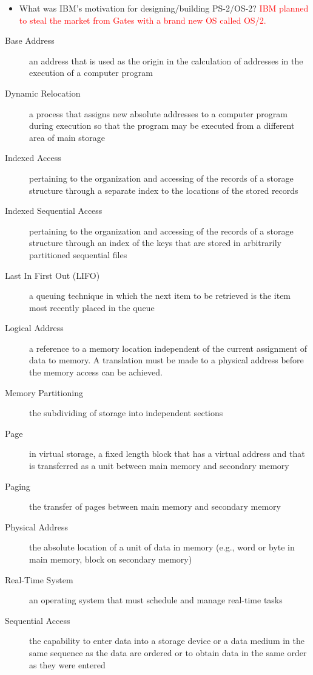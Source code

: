 \documentclass[9pt,landscape]{memoir}
\newcommand{\answer}[1]{\textcolor{red}{#1}}
\begin{document}
\begin{multicols}{6}
\begin{itemize}
    \item What was IBM's motivation for designing/building PS-2/OS-2? \answer{IBM planned to steal the market from Gates with a brand new OS called OS/2.}
\end{itemize}

\begin{description}
    \item[Base Address] an address that is used as the origin in the calculation of addresses in the execution of a computer program
    \item[Dynamic Relocation] a process that assigns new absolute addresses to a computer program during execution so that the program may be executed from a different area of main storage
    \item[Indexed Access] pertaining to the organization and accessing of the records of a storage structure through a separate index to the locations of the stored records
    \item[Indexed Sequential Access] pertaining to the organization and accessing of the records of a storage structure through an index of the keys that are stored in arbitrarily partitioned sequential files
    \item[Last In First Out (LIFO)] a queuing technique in which the next item to be retrieved is the item most recently placed in the queue
    \item[Logical Address] a reference to a memory location independent of the current assignment of data to memory.  A translation must be made to a physical address before the memory access can be achieved.
    \item[Memory Partitioning] the subdividing of storage into independent sections
    \item[Page] in virtual storage, a fixed length block that has a virtual address and that is transferred as a unit between main memory and secondary memory
    \item[Paging] the transfer of pages between main memory and secondary memory
    \item[Physical Address] the absolute location of a unit of data in memory (e.g., word or byte in main memory, block on secondary memory)
    \item[Real-Time System] an operating system that must schedule and manage real-time tasks
    \item[Sequential Access] the capability to enter data into a storage device or a data medium in the same sequence as the data are ordered or to obtain data in the same order as they were entered

\end{description}
\end{multicols}
\end{document}
